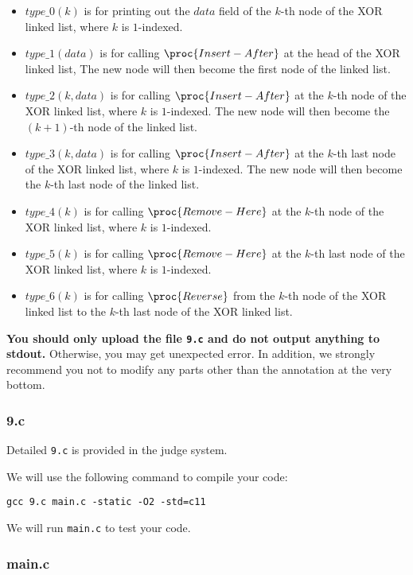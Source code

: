 \begin{itemize}
    \item $type\_0(k)$ is for printing out the $data$ field of the $k$-th node of the XOR linked list, where $k$ is $1$-indexed.
    \item $type\_1(data)$ is for calling $\proc{Insert-After}$ at the head of the XOR linked list, The new node will then become the first node of the linked list.
    \item $type\_2(k, data)$ is for calling $\proc{Insert-After}$ at the $k$-th node of the XOR linked list, where $k$ is $1$-indexed. The new node will then become the $(k+1)$-th node of the linked list.
    \item $type\_3(k, data)$ is for calling $\proc{Insert-After}$ at the $k$-th last node of the XOR linked list, where $k$ is $1$-indexed. The new node will then become the $k$-th last node of the linked list.
    \item $type\_4(k)$ is for calling $\proc{Remove-Here}$ at the $k$-th node of the XOR linked list, where $k$ is $1$-indexed.
    \item $type\_5(k)$ is for calling $\proc{Remove-Here}$ at the $k$-th last node of the XOR linked list, where $k$ is $1$-indexed. 
    \item $type\_6(k)$ is for calling $\proc{Reverse}$ from the $k$-th node of the XOR linked list to the $k$-th last node of the XOR linked list.
\end{itemize}

\textbf{You should only upload the file \texttt{9.c} and do not output anything to stdout.} Otherwise, you may get unexpected error. In addition, we strongly recommend you not to modify any parts other than the annotation at the very bottom. 

\subsubsection{9.c}\label{9.c}

Detailed \texttt{9.c} is provided in the judge system.

\noindent We will use the following command to compile your code:

\begin{center}
\texttt{gcc 9.c main.c -static -O2 -std=c11}
\end{center}

\noindent We will run \texttt{main.c} to test your code.

\subsubsection{main.c}\label{main.c}

